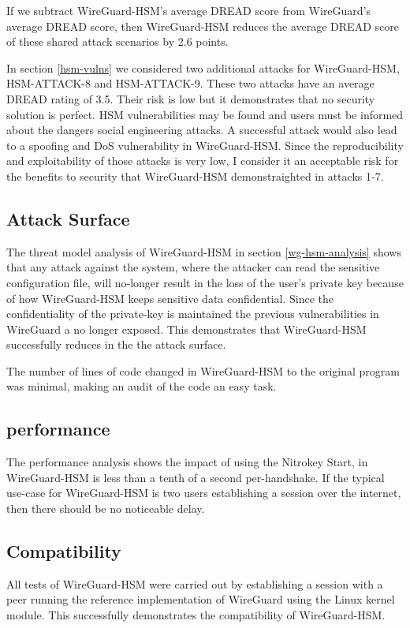 \documentclass [11pt, proquest] {uwthesis}[2020/02/24]
\begin{document}
If we subtract WireGuard-HSM's average DREAD score from WireGuard's average DREAD score, then WireGuard-HSM reduces the average DREAD score of these shared attack scenarios by 2.6 points.

In section \ref{hsm-vulns} we considered two additional attacks for WireGuard-HSM, HSM-ATTACK-8 and HSM-ATTACK-9. 
These two attacks have an average DREAD rating of 3.5. Their risk is low but it demonstrates that no security solution is perfect. HSM vulnerabilities may be found and users must be informed about the dangers social engineering attacks.
A successful attack would also lead to a spoofing and DoS vulnerability in WireGuard-HSM. Since the reproducibility and exploitability of those attacks is very low, I consider it an acceptable risk for the benefits to security that WireGuard-HSM demonstraighted in attacks 1-7.


\subsection{Attack Surface}
The threat model analysis of WireGuard-HSM in section \ref{wg-hsm-analysis} shows that any attack against the system, where the attacker can read the sensitive configuration file, will no-longer result in the loss of the user's private key because of how WireGuard-HSM keeps sensitive data confidential. Since the confidentiality of the private-key is maintained the previous vulnerabilities in WireGuard a no longer exposed. This demonstrates that WireGuard-HSM successfully reduces in the the attack surface.

The number of lines of code changed in WireGuard-HSM to the original program was minimal, making an audit of the code an easy task.

\subsection{performance}
The performance analysis shows the impact of using the Nitrokey Start, in  WireGuard-HSM is less than a tenth of a second per-handshake. If the typical use-case for WireGuard-HSM is two users establishing a session over the internet, then there should be no noticeable delay.

\subsection{Compatibility}
All tests of WireGuard-HSM were carried out by establishing a session with a peer running the reference implementation of WireGuard using the Linux kernel module. This successfully demonstrates the compatibility of WireGuard-HSM.
\end{document}
